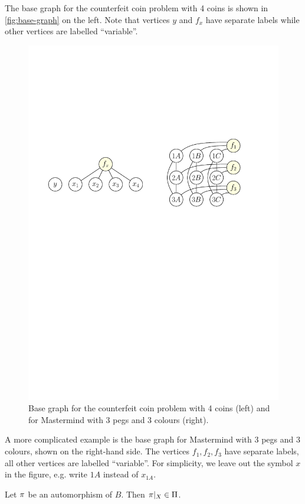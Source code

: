 \begin{example} \label{ex:cc-runbase}
The base graph for the counterfeit coin problem with 4 coins is shown in
\autoref{fig:base-graph} on the left.
Note that vertices $y$ and $f_x$ have separate labels while
  other vertices are labelled ``variable''.

\begin{figure}[ht]
\begin{center}
\includegraphics[width=.6\textwidth]{pictures/base-graph.pdf}
\caption{Base graph for the counterfeit coin problem with 4 coins (left) and\\
  for Mastermind with 3 pegs and 3 colours (right).}
\label{fig:base-graph}
\end{center}
\end{figure}
\end{example}

A more complicated example is the base graph for Mastermind with 3 pegs and 3 colours,
  shown on the right-hand side.
The vertices $f_1, f_2, f_3$ have separate labels, all other vertices are labelled ``variable''.
For simplicity, we leave out the symbol $x$ in the figure, e.g.
  write $1A$ instead of $x_{1A}$.\eqed

\begin{lemma}\label{lma:autobase}
Let  $\pi$ be an automorphism of $B$. Then $\pi|_X \in\Pi$.
\end{lemma}


